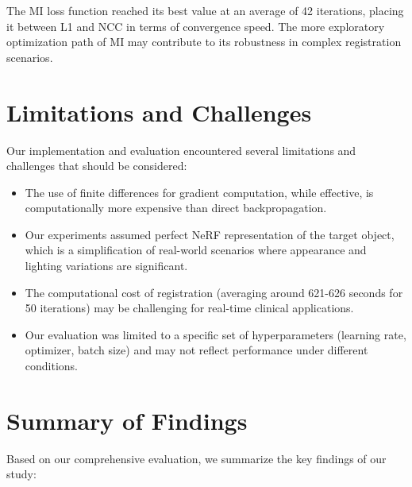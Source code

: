 The MI loss function reached its best value at an average of 42 iterations, placing it between L1 and NCC in terms of convergence speed. The more exploratory optimization path of MI may contribute to its robustness in complex registration scenarios.

\section{Limitations and Challenges}

Our implementation and evaluation encountered several limitations and challenges that should be considered:

\begin{itemize}
    \item The use of finite differences for gradient computation, while effective, is computationally more expensive than direct backpropagation.
    
    \item Our experiments assumed perfect NeRF representation of the target object, which is a simplification of real-world scenarios where appearance and lighting variations are significant.
    
    \item The computational cost of registration (averaging around 621-626 seconds for 50 iterations) may be challenging for real-time clinical applications.
    
    \item Our evaluation was limited to a specific set of hyperparameters (learning rate, optimizer, batch size) and may not reflect performance under different conditions.
\end{itemize}

\section{Summary of Findings}

Based on our comprehensive evaluation, we summarize the key findings of our study:

